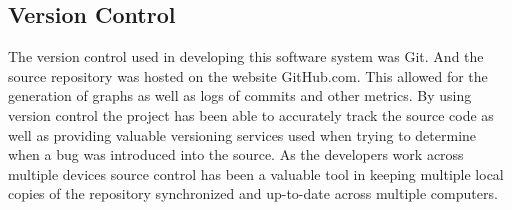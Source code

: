 \documentclass[12pt, a4]{report}
\begin{document}
\subsection{Version Control}
\par The version control used in developing this software system was Git. And the source repository was hosted on the website GitHub.com. This allowed for the generation of graphs as well as logs of commits and other metrics. By using version control the project has been able to accurately track the source code as well as providing valuable versioning services used when trying to determine when a bug was introduced into the source. As the developers work across multiple devices source control has been a valuable tool in keeping multiple local copies of the repository synchronized and up-to-date across multiple computers.
\end{document}

